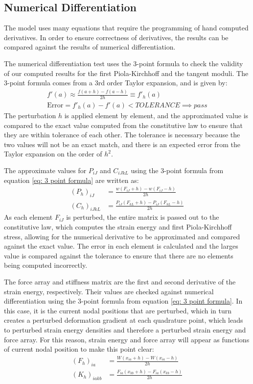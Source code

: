 \documentclass[]{spie}  %
\begin{document}
\subsection{Numerical Differentiation}
The model uses many equations that require the programming of hand computed derivatives. In order to ensure correctness of derivatives, the results can be compared against the results of numerical differentiation.

The numerical differentiation test uses the 3-point formula to check the validity of our computed results for the first Piola-Kirchhoff and the tangent moduli. The 3-point formula comes from a 3rd order Taylor expansion, and is given by:
\begin{gather}
\label{eq: 3 point formula}
f'(a) \approx \frac{f(a + h) - f(a - h)}{2h} \equiv f'_h(a) \\[1ex]
\textrm{Error} = f'_h(a) - f'(a) < TOLERANCE \implies pass
\end{gather}
The perturbation $h$ is applied element by element, and the approximated value is compared to the exact value computed from the constitutive law to ensure that they are within tolerance of each other. The tolerance is necessary because the two values will not be an exact match, and there is an expected error from the Taylor expansion on the order of $h^2$. 

The approximate values for $P_{iJ}$ and $C_{iJkL}$ using the 3-point formula from equation \ref{eq: 3 point formula} are written as:
\begin{align}
(P_h)_{iJ} &= \frac{w(F_{iJ} + h) - w(F_{iJ} - h)}{2h} \\[1ex]
(C_h)_{iJkL} &= \frac{P_{iJ}(F_{kL} + h) - P_{iJ}(F_{kL} - h)}{2h}
\end{align}
As each element $F_{iJ}$ is perturbed, the entire matrix is passed out to the constitutive law, which computes the strain energy and first Piola-Kirchhoff stress, allowing for the numerical derivative to be approximated and compared against the exact value. The error in each element is calculated and the larges value is compared against the tolerance to ensure that there are no elements being computed incorrectly. 

The force array and stiffness matrix are the first and second derivative of the strain energy, respectively. Their values are checked against numerical differentiation using the 3-point formula from equation \ref{eq: 3 point formula}. In this case, it is the current nodal positions that are perturbed, which in turn creates a perturbed deformation gradient at each quadrature point, which leads to perturbed strain energy densities and therefore a perturbed strain energy and force array. For this reason, strain energy and force array will appear as functions of current nodal position to make this point clear:
\begin{align}
(F_h)_{ia} &= \frac{W(x_{ia} + h) - W(x_{ia} - h)}{2h} \\[1ex]
(K_h)_{iakb} &= \frac{F_{ia}(x_{kb} + h) - F_{ia}(x_{kb} - h)}{2h}
\end{align}
\end{document}
